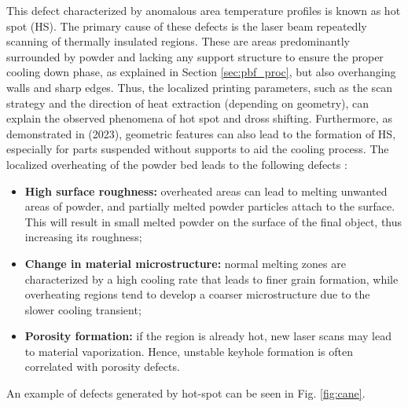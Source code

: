 This defect characterized by anomalous area temperature profiles is known as hot spot (HS). The primary cause of these defects is the laser beam repeatedly scanning of thermally insulated regions. These are areas predominantly surrounded by powder and lacking any support structure to ensure the proper cooling down phase, as explained in Section \ref{sec:pbf_proc}, but also overhanging walls and sharp edges. Thus, the localized printing parameters, such as the scan strategy and the direction of heat extraction (depending on geometry), can explain the observed phenomena of hot spot and dross shifting. Furthermore, as demonstrated in \citeauthor{moshiri_performance_2023} (2023), geometric features can also lead to the formation of HS, especially for parts suspended without supports to aid the cooling process. The localized overheating of the powder bed leads to the following defects \cite{bugatti_towards_2022}:
\begin{itemize}
    \item \textbf{High surface roughness:} overheated areas can lead to melting unwanted areas of powder, and partially melted powder particles attach to the surface. This will result in small melted powder on the surface of the final object, thus increasing its roughness;
    \item \textbf{Change in material microstructure:} normal melting zones are characterized by a high cooling rate that leads to finer grain formation, while overheating regions tend to develop a coarser microstructure due to the slower cooling transient;
    \item \textbf{Porosity formation:} if the region is already hot, new laser scans may lead to material vaporization. Hence, unstable keyhole formation is often correlated with porosity defects.
\end{itemize} An example of defects generated by hot-spot can be seen in Fig. \ref{fig:cane}.

